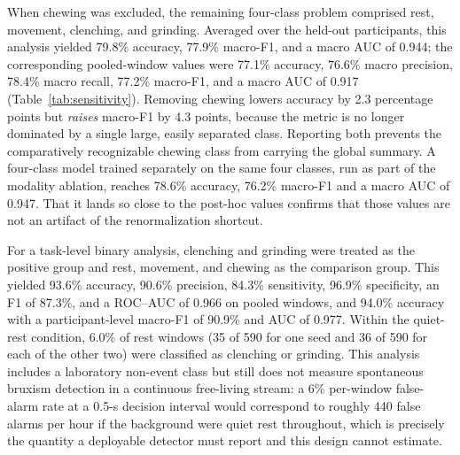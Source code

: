 \documentclass[pdflatex,sn-nature,iicol]{sn-jnl}
\begin{document}
When chewing was excluded, the remaining four-class problem comprised rest, movement, clenching, and grinding. Averaged over the held-out participants, this analysis yielded 79.8\% accuracy, 77.9\% macro-F1, and a macro AUC of 0.944; the corresponding pooled-window values were 77.1\% accuracy, 76.6\% macro precision, 78.4\% macro recall, 77.2\% macro-F1, and a macro AUC of 0.917 (Table~\ref{tab:sensitivity}). Removing chewing lowers accuracy by 2.3 percentage points but \emph{raises} macro-F1 by 4.3 points, because the metric is no longer dominated by a single large, easily separated class. Reporting both prevents the comparatively recognizable chewing class from carrying the global summary. A four-class model trained separately on the same four classes, run as part of the modality ablation, reaches 78.6\% accuracy, 76.2\% macro-F1 and a macro AUC of 0.947. That it lands so close to the post-hoc values confirms that those values are not an artifact of the renormalization shortcut.

For a task-level binary analysis, clenching and grinding were treated as the positive group and rest, movement, and chewing as the comparison group. This yielded 93.6\% accuracy, 90.6\% precision, 84.3\% sensitivity, 96.9\% specificity, an F1 of 87.3\%, and a ROC--AUC of 0.966 on pooled windows, and 94.0\% accuracy with a participant-level macro-F1 of 90.9\% and AUC of 0.977. Within the quiet-rest condition, 6.0\% of rest windows (35 of 590 for one seed and 36 of 590 for each of the other two) were classified as clenching or grinding. This analysis includes a laboratory non-event class but still does not measure spontaneous bruxism detection in a continuous free-living stream: a 6\% per-window false-alarm rate at a 0.5-s decision interval would correspond to roughly 440 false alarms per hour if the background were quiet rest throughout, which is precisely the quantity a deployable detector must report and this design cannot estimate.
\end{document}
